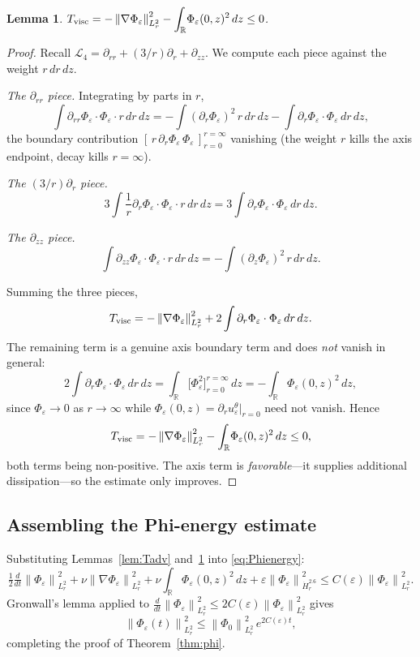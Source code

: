\documentclass{article}
\newtheorem{lemma}[theorem]{Lemma}
\theoremstyle{definition}
\theoremstyle{remark}
\newcommand{\R}{\mathbb{R}}
\newcommand{\e}{\varepsilon}
\newcommand{\half}{\tfrac{1}{2}}
\newcommand{\Lc}{\mathcal{L}}
\newcommand{\norm}[1]{\left\|#1\right\|}
\newcommand{\ddt}{\tfrac{d}{dt}}
\begin{document}
\begin{lemma}\label{lem:Tvisc}
  $T_{\rm visc}
  = -\norm{\nabla\Phi_\e}_{L^2_r}^2
  - \displaystyle\int_{\R}\!\Phi_\e(0,z)^2\,dz \le 0$.
\end{lemma}
\begin{proof}
  Recall $\Lc_4 = \partial_{rr} + (3/r)\partial_r + \partial_{zz}$.
  We compute each piece against the weight $r\,dr\,dz$.

  \medskip\noindent
  \emph{The $\partial_{rr}$ piece.}
  Integrating by parts in $r$,
  \[
    \int\partial_{rr}\Phi_\e\cdot\Phi_\e\cdot r\,dr\,dz
    = -\int(\partial_r\Phi_\e)^2\,r\,dr\,dz
      - \int\partial_r\Phi_\e\cdot\Phi_\e\,dr\,dz,
  \]
  the boundary contribution
  $[\,r\,\partial_r\Phi_\e\,\Phi_\e\,]_{r=0}^{r=\infty}$ vanishing (the
  weight $r$ kills the axis endpoint, decay kills $r=\infty$).

  \medskip\noindent
  \emph{The $(3/r)\partial_r$ piece.}
  \[
    3\int\frac{1}{r}\partial_r\Phi_\e\cdot\Phi_\e\cdot r\,dr\,dz
    = 3\int\partial_r\Phi_\e\cdot\Phi_\e\,dr\,dz.
  \]

  \medskip\noindent
  \emph{The $\partial_{zz}$ piece.}
  \[
    \int\partial_{zz}\Phi_\e\cdot\Phi_\e\cdot r\,dr\,dz
    = -\int(\partial_z\Phi_\e)^2\,r\,dr\,dz.
  \]

  Summing the three pieces,
  \[
    T_{\rm visc}
    = -\norm{\nabla\Phi_\e}_{L^2_r}^2
      + 2\int\partial_r\Phi_\e\cdot\Phi_\e\,dr\,dz .
  \]
  The remaining term is a genuine axis boundary term and does
  \emph{not} vanish in general:
  \[
    2\int\partial_r\Phi_\e\cdot\Phi_\e\,dr\,dz
    = \int_{\R}\!\bigl[\Phi_\e^2\bigr]_{r=0}^{r=\infty}\,dz
    = -\int_{\R}\!\Phi_\e(0,z)^2\,dz,
  \]
  since $\Phi_\e\to 0$ as $r\to\infty$ while
  $\Phi_\e(0,z) = \partial_r u^\theta_\e|_{r=0}$ need not vanish.  Hence
  \[
    T_{\rm visc} = -\norm{\nabla\Phi_\e}_{L^2_r}^2
    - \int_{\R}\!\Phi_\e(0,z)^2\,dz \le 0,
  \]
  both terms being non-positive.  The axis term is \emph{favorable}---it
  supplies additional dissipation---so the estimate only improves.
  \qedhere
\end{proof}

\subsection{Assembling the Phi-energy estimate}

Substituting Lemmas~\ref{lem:Tadv} and~\ref{lem:Tvisc} into
\eqref{eq:Phienergy}:
\begin{equation}\label{eq:phifull}
  \half\ddt\norm{\Phi_\e}_{L^2_r}^2
  + \nu\norm{\nabla\Phi_\e}_{L^2_r}^2
  + \nu\int_{\R}\!\Phi_\e(0,z)^2\,dz
  + \e\norm{\Phi_\e}_{\dot H^{2.6}_r}^2
  \le C(\e)\norm{\Phi_\e}_{L^2_r}^2.
\end{equation}
Gronwall's lemma applied to
$\ddt\norm{\Phi_\e}_{L^2_r}^2 \le 2C(\e)\norm{\Phi_\e}_{L^2_r}^2$ gives
\[
  \norm{\Phi_\e(t)}_{L^2_r}^2
  \le \norm{\Phi_0}_{L^2_r}^2\,e^{2C(\e)t},
\]
completing the proof of Theorem~\ref{thm:phi}.
\end{document}
